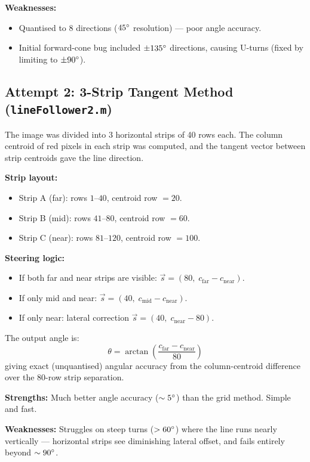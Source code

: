 \documentclass[conference, twocolumn]{IEEEtran}
\begin{document}
\textbf{Weaknesses:}
\begin{itemize}
    \item Quantised to 8 directions ($45\degree$ resolution) --- poor angle accuracy.
    \item Initial forward-cone bug included $\pm135\degree$ directions, causing U-turns (fixed by limiting to $\pm90\degree$).
\end{itemize}

\subsection{Attempt 2: 3-Strip Tangent Method (\texttt{lineFollower2.m})}

The image was divided into 3 horizontal strips of 40 rows each. The column centroid of red pixels in each strip was computed, and the tangent vector between strip centroids gave the line direction.

\textbf{Strip layout:}
\begin{itemize}
    \item Strip A (far): rows $1$--$40$, centroid row $= 20$.
    \item Strip B (mid): rows $41$--$80$, centroid row $= 60$.
    \item Strip C (near): rows $81$--$120$, centroid row $= 100$.
\end{itemize}

\textbf{Steering logic:}
\begin{itemize}
    \item If both far and near strips are visible: $\vec{s} = (80,\; c_{\mathrm{far}} - c_{\mathrm{near}})$.
    \item If only mid and near: $\vec{s} = (40,\; c_{\mathrm{mid}} - c_{\mathrm{near}})$.
    \item If only near: lateral correction $\vec{s} = (40,\; c_{\mathrm{near}} - 80)$.
\end{itemize}

The output angle is:
\begin{equation}
    \theta = \arctan\!\left(\frac{c_{\mathrm{far}} - c_{\mathrm{near}}}{80}\right)
\end{equation}
giving exact (unquantised) angular accuracy from the column-centroid difference over the 80-row strip separation.

\textbf{Strengths:} Much better angle accuracy ($\sim5\degree$) than the grid method. Simple and fast.

\textbf{Weaknesses:} Struggles on steep turns ($>60\degree$) where the line runs nearly vertically --- horizontal strips see diminishing lateral offset, and fails entirely beyond $\sim90\degree$.
\end{document}
